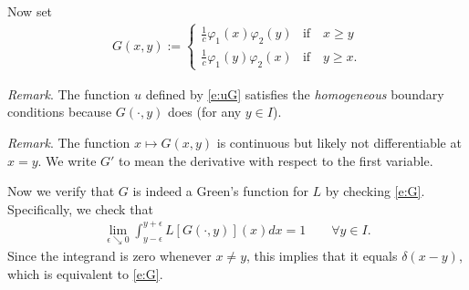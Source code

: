 \documentclass[12pt,a4paper]{article}
\begin{document}
    
    Now set
    \begin{align}
        G(x, y)
        :=
        \begin{cases}
            \frac1c \varphi_1(x) \varphi_2(y) & \text{if} \quad x \geq y
            \\
            \frac1c \varphi_1(y) \varphi_2(x) & \text{if} \quad y \geq x
            .
        \end{cases}
    \end{align}
    
    

    
    \emph{Remark}.
    The function $u$ defined by \eqref{e:uG}
    satisfies the \emph{homogeneous} boundary conditions
    because
    $G(\cdot, y)$ does (for any $y \in I$).
    
    
    \emph{Remark}.
    The function $x \mapsto G(x, y)$ is 
    continuous but likely not differentiable at $x = y$.
    We write $G'$ to mean the derivative 
    with respect to the first variable.
    
    
    Now we verify that $G$ is indeed a Green's function 
    for $L$ by checking \eqref{e:G}.
    Specifically, we check that
    \begin{align}
        \label{e:?}
        \lim_{\epsilon \searrow 0}
        \int_{y - \epsilon}^{y + \epsilon}
        L [G(\cdot, y)](x) dx
        =
        1
        \qquad
        \forall y \in I
        .
    \end{align}
    Since the integrand is zero whenever $x \neq y$,
    this implies that it equals $\delta(x - y)$,
    which is equivalent to \eqref{e:G}.
\end{document}
